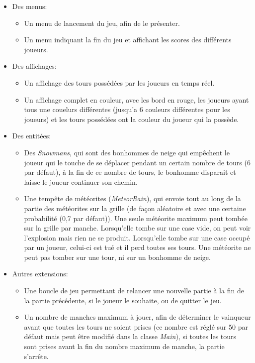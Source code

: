 \begin{itemize}
    \item Des menus:
    \begin{itemize}
        \item Un menu de lancement du jeu, afin de le présenter.
        \item Un menu indiquant la fin du jeu et affichant les scores des différents joueurs.
    \end{itemize} 

    \item Des affichages:
    \begin{itemize}
        \item Un affichage des tours possédées par les joueurs en temps réel.
        \item Un affichage complet en couleur, avec les bord en rouge, les joueurs ayant tous une couelurs différentes (jusqu'a 6 couleurs différentes pour les joueurs) et les tours possédées ont la couleur du joueur qui la possède.
    \end{itemize} 

    \item Des entitées:
    \begin{itemize}
        \item Des \textit{Snowmans}, qui sont des bonhommes de neige qui empêchent le joueur qui le touche de se déplacer pendant un certain nombre de tours (6 par défaut), à la fin de ce nombre de tours, le bonhomme disparait et laisse le joueur continuer son chemin.
        \item Une tempête de météorites (\textit{MeteorRain}), qui envoie tout au long de la partie des météorites sur la grille (de façon aléatoire et avec une certaine probabilité (0,7 par défaut)). Une seule météorite maximum peut tombée sur la grille par manche. Lorsqu'elle tombe sur une case vide, on peut voir l'explosion mais rien ne se produit. Lorsqu'elle tombe sur une case occupé par un joueur, celui-ci est tué et il perd toutes ses tours. Une météorite ne peut pas tomber sur une tour, ni sur un bonhomme de neige.
    \end{itemize}

    \item Autres extensions:
    \begin{itemize}
        \item Une boucle de jeu permettant de relancer une nouvelle partie à la fin de la partie précédente, si le joueur le souhaite, ou de quitter le jeu.
        \item Un nombre de manches maximum à jouer, afin de déterminer le vainqueur avant que toutes les tours ne soient prises (ce nombre est réglé sur 50 par défaut mais peut être modifié dans la classe \textit{Main}), si toutes les tours sont prises avant la fin du nombre maximum de manche, la partie s'arrête.
    \end{itemize}
\end{itemize}
\bigskip

